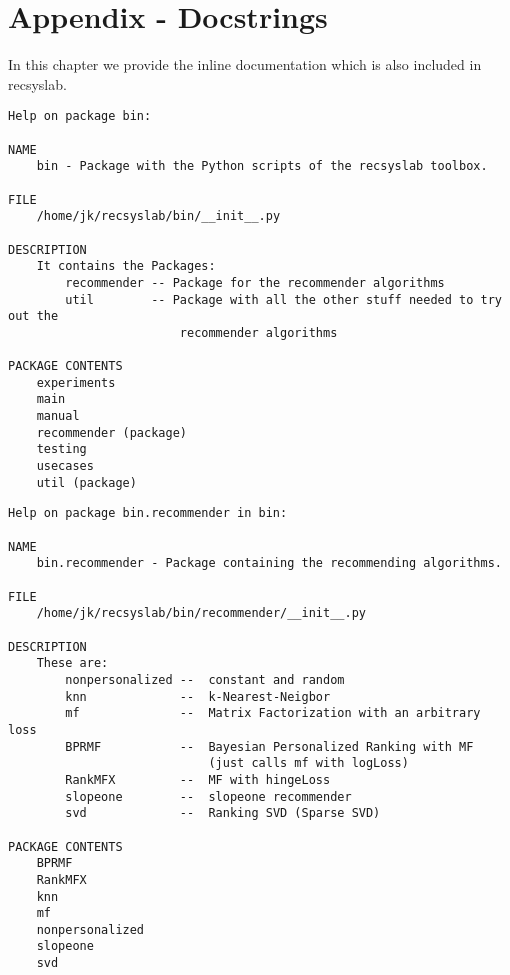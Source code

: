 \chapter{Appendix - Docstrings}
In this chapter we provide the inline documentation which is also included
in recsyslab.

\begin{lstlisting}[style=docstring]
Help on package bin:

NAME
    bin - Package with the Python scripts of the recsyslab toolbox.

FILE
    /home/jk/recsyslab/bin/__init__.py

DESCRIPTION
    It contains the Packages:
        recommender -- Package for the recommender algorithms
        util        -- Package with all the other stuff needed to try out the
                        recommender algorithms

PACKAGE CONTENTS
    experiments
    main
    manual
    recommender (package)
    testing
    usecases
    util (package)
\end{lstlisting}

\begin{lstlisting}[style=docstring]
Help on package bin.recommender in bin:

NAME
    bin.recommender - Package containing the recommending algorithms.

FILE
    /home/jk/recsyslab/bin/recommender/__init__.py

DESCRIPTION
    These are:
        nonpersonalized --  constant and random
        knn             --  k-Nearest-Neigbor
        mf              --  Matrix Factorization with an arbitrary loss
        BPRMF           --  Bayesian Personalized Ranking with MF
                            (just calls mf with logLoss)
        RankMFX         --  MF with hingeLoss
        slopeone        --  slopeone recommender
        svd             --  Ranking SVD (Sparse SVD)

PACKAGE CONTENTS
    BPRMF
    RankMFX
    knn
    mf
    nonpersonalized
    slopeone
    svd
\end{lstlisting}

